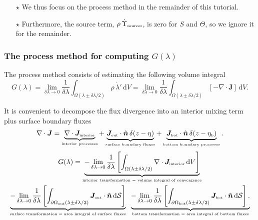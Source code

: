 \documentclass[10pt]{beamer}
\begin{document}
\begin{frame}
\begin{itemize}
\item[$\star$] We thus focus on the process method in the remainder of
  this tutorial.

\item[$\star$] Furthermore, the source term,
  $\rho \, \dot{\Upsilon}_{\mbox{\tiny sources}}$, is zero for $S$
and $\Theta$, so we ignore it for the remainder.

\end{itemize}


\end{frame}



\begin{frame}
  \frametitle{The process method for computing $G(\lambda)$}
\scriptsize 

\begin{exampleblock}{}
 
The process method consists of estimating the following volume
integral
\begin{equation*}
 G(\lambda) 
 = 
\lim_{\delta \lambda \rightarrow 0}
 \frac{1}{\delta \lambda}
 \int_{\Omega(\lambda \pm \delta \lambda/2)} \rho \, \dot{\lambda}' \, \mathrm{d}V
=
\lim_{\delta \lambda \rightarrow 0}
 \frac{1}{\delta \lambda}
 \int_{\Omega(\lambda \pm \delta \lambda/2)} [-\nabla \cdot {\bm J} ] \, \mathrm{d}V.
\end{equation*}

\end{exampleblock}

It is convenient to decompose the flux divergence into an interior
mixing term plus surface boundary fluxes 
\begin{equation*}
  \nabla \cdot {\bm J} =    \underbrace{ \nabla \cdot {\bm J}_{\mbox{\tiny interior}}
     }_{\mbox{\tiny interior processes}} 
  + \underbrace{ {\bm J}_{\mbox{\tiny out}} \cdot \hat{\bm n} \, \delta (z-\eta)
      }_{\mbox{\tiny surface boundary fluxes}}
  + \underbrace{ {\bm J}_{\mbox{\tiny bot}} \cdot \hat{\bm n} \, \delta (z-\eta_{\mbox{\tiny b}})
     }_{\mbox{\tiny bottom boundary processes}}.
\end{equation*}
\begin{multline*}
 G(\lambda)
 =
 \underbrace{
  -\lim_{\delta \lambda \rightarrow 0}
 \frac{1}{\delta \lambda}
 \left[ \int_{\Omega(\lambda \pm \delta \lambda/2)} \nabla \cdot {\bm J}_{\mbox{\tiny interior}} \, \mathrm{d}V
  \right]
  }_{\mbox{\tiny interior transformation = volume integral of convergence}}
 \\
 \underbrace{
  -\lim_{\delta \lambda \rightarrow 0}
 \frac{1}{\delta \lambda}
 \left[ \int_{\partial \Omega_{\mbox{\tiny out}} (\lambda \pm \delta \lambda/2)} 
{\bm J}_{\mbox{\tiny out}} \cdot \hat{\bm n} \, \mathrm{d}\mathcal{S}
  \right]
 }_{\mbox{\tiny surface transformation = area integral of surface fluxes}}
\; \;
 \underbrace{
  -\lim_{\delta \lambda \rightarrow 0}
 \frac{1}{\delta \lambda}
 \left[ \int_{\partial \Omega_{\mbox{\tiny  bot}} (\lambda \pm \delta \lambda/2)} 
{\bm J}_{\mbox{\tiny bot}} \cdot \hat{\bm n} \, \mathrm{d}\mathcal{S}
  \right].
 }_{\mbox{\tiny bottom transformation = area integral of bottom fluxes}}
\end{multline*}


\end{frame}
\end{document}

